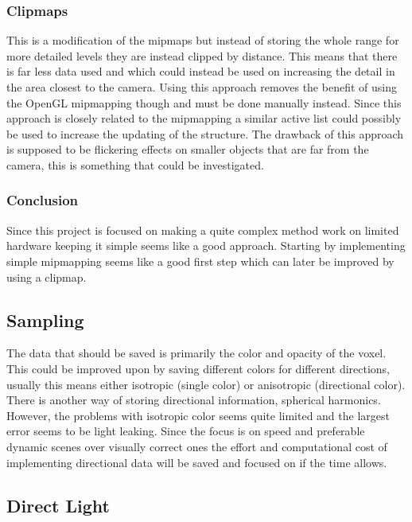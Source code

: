 \documentclass[a4paper, 12pt]{article}
\begin{document}
\subsubsection{Clipmaps}

This is a modification of the mipmaps but instead of storing the whole range for more detailed levels they are instead clipped by distance. This means that there is far less data used and which could instead be used on increasing the detail in the area closest to the camera. Using this approach removes the benefit of using the OpenGL mipmapping though and must be done manually instead. Since this approach is closely related to the mipmapping a similar active list could possibly be used to increase the updating of the structure. The drawback of this approach is supposed to be flickering effects on smaller objects that are far from the camera, this is something that could be investigated.

\subsubsection{Conclusion}

Since this project is focused on making a quite complex method work on limited hardware keeping it simple seems like a good approach. Starting by implementing simple mipmapping seems like a good first step which can later be improved by using a clipmap.

\subsection{Sampling}

The data that should be saved is primarily the color and opacity of the voxel. This could be improved upon by saving different colors for different directions, usually this means either isotropic (single color) or anisotropic (directional color). There is another way of storing directional information, spherical harmonics. However, the problems with isotropic color seems quite limited and the largest error seems to be light leaking. Since the focus is on speed and preferable dynamic scenes over visually correct ones the effort and computational cost of implementing directional data will be saved and focused on if the time allows.

\subsection{Direct Light}
\end{document}
